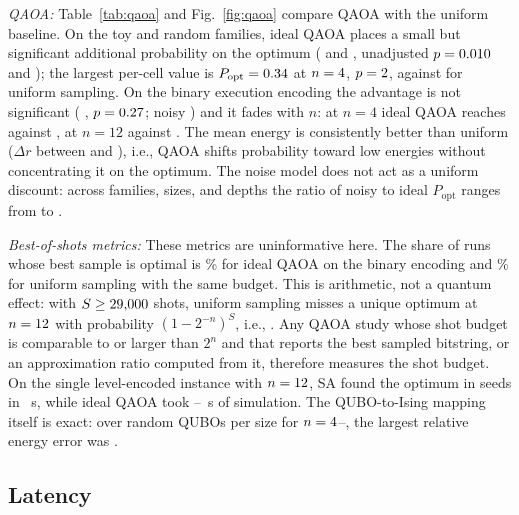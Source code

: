 \documentclass[journal]{IEEEtran}
\newcommand{\Popt}{P_{\mathrm{opt}}}
\begin{document}
\emph{QAOA:} Table~\ref{tab:qaoa} and Fig.~\ref{fig:qaoa} compare QAOA with the uniform
baseline. On the toy and random families, ideal QAOA places a small but significant
additional probability on the optimum (\QaoaToyIdealPoptMean{} \QaoaToyIdealPoptCi{} and
\QaoaRandomIdealPoptMean{} \QaoaRandomIdealPoptCi, unadjusted $p=0.010$ and
\QaoaRandomIdealPoptP); the largest per-cell value is $\Popt=\QaoaToyBestCellPopt$ at
$n=4$, $p=2$, against \QaoaToyBestCellUniform{} for uniform
sampling. On the binary execution encoding the advantage is not significant
(\QaoaSliceIdealPoptMean{} \QaoaSliceIdealPoptCi, $p=0.27$; noisy
\QaoaSliceNoisyPoptMean{} \QaoaSliceNoisyPoptCi) and it fades with $n$: at $n=4$ ideal QAOA
reaches \QaoaSliceNFourPopt{} against \QaoaSliceNFourUniform, at $n=12$ \QaoaSliceNOneTwoPopt{}
against \QaoaSliceNOneTwoUniform. The mean energy is consistently better than uniform
($\Delta r$ between \QaoaEnergyMin{} and \QaoaEnergyMax), i.e., QAOA
shifts probability toward low energies without concentrating it on the optimum. The noise
model does not act as a uniform discount: across families, sizes, and depths the ratio of
noisy to ideal $\Popt$ ranges from \NoiseRatioMin{} to \NoiseRatioMax.

\emph{Best-of-shots metrics:} These metrics are uninformative here. The share of runs whose best sample is
optimal is \QaoaSliceIdealBestOpt\% for ideal QAOA on the binary encoding and \QaoaSliceIdealUniformBestOpt\% for uniform
sampling with the same budget. This is arithmetic, not a quantum effect: with
$S\ge29{,}000$ shots, uniform sampling misses a unique optimum at $n=12$ with
probability $(1-2^{-n})^S$, i.e., \UniformMissProbMaxN. Any QAOA study whose shot budget is
comparable to or larger than $2^n$ and that
reports the best sampled bitstring, or an approximation ratio computed from it, therefore
measures the shot budget. On the single level-encoded instance with $n=12$, SA found the
optimum in \InstanceSaOptimal{} seeds in \InstanceSaTime~s, while ideal QAOA took
\InstanceQaoaTimeMin--\InstanceQaoaTimeMax~s of simulation. The QUBO-to-Ising mapping itself
is exact: over \IsingSamples{} random QUBOs per size for $n=4$--\IsingMaxN, the
largest relative energy error was \IsingMaxRelError.

\subsection{Latency}
\label{sec:latency}
\end{document}
